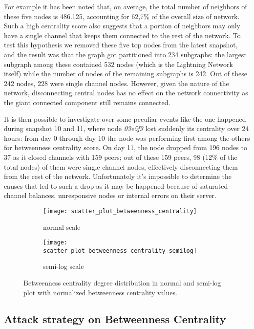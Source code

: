 	For example it has been noted that, on average, the total number of neighbors of these five nodes is 486.125, accounting for 62,7\% of the overall size of network. Such a high centrality score also suggests that a portion of neighbors may only have a single channel that keeps them connected to the rest of the network. To test this hypothesis we removed these five top nodes from the latest snapshot, and the result was that the graph got partitioned into 234 subgraphs: the largest subgraph among these contained 532 nodes (which is the Lightning Network itself) while the number of nodes of the remaining subgraphs is 242. Out of these 242 nodes, 228 were single channel nodes. However, given the nature of the network, disconnecting central nodes has no effect on the network connectivity as the giant connected component still remains connected.

	It is then possible to investigate over some peculiar events like the one happened during snapshot 10 and 11, where node \textit{03e5f9} lost suddenly its centrality over 24 hours: 
	from day 0 through day 10 the node was performing first among the others for betweenness centrality score. On day 11, the node dropped from 196 nodes to 37 as it closed channels with 159 peers; out of these 159 peers, 98 (12\% of the total nodes) of them were single channel nodes, effectively disconnecting them from the rest of the network. Unfortunately it's impossible to determine the causes that led to such a drop as it may be happened because of saturated channel balances, unresponsive nodes or internal errors on their server.
	
	\begin{figure}
		\centering
		\begin{subfigure}{0.8\textwidth}
			\centering
			\texttt{[image: scatter\_plot\_betweenness\_centrality]}
			\caption{normal scale}
		\end{subfigure}
		\begin{subfigure}{0.8\textwidth}
			\centering
			\texttt{[image: scatter\_plot\_betweenness\_centrality\_semilog]}
			\caption{semi-log scale}
		\end{subfigure}
		\caption{Betweenness centrality degree distribution in normal and semi-log plot with normalized betweenness centrality values. }
		\label{betweenness_centrality_degree}
	\end{figure}
	
	\subsection{Attack strategy on Betweenness Centrality}
	
